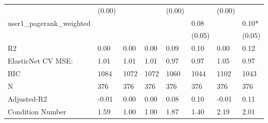 \begin{table}
\begin{center}
\begin{tabular}{llllllll}
                                               & (0.00)   &            &         & (0.00)  &          & (0.00)      &          \\
user1_pagerank_weighted                        &          &            &         &         & 0.08     &             & 0.10*    \\
                                               &          &            &         &         & (0.05)   &             & (0.05)   \\
R2                                             & 0.00     & 0.00       & 0.00    & 0.09    & 0.10     & 0.00        & 0.12     \\
ElasticNet CV MSE:                             & 1.01     & 1.01       & 1.01    & 0.97    & 0.97     & 1.05        & 0.97     \\
BIC                                            & 1084     & 1072       & 1072    & 1060    & 1044     & 1102        & 1043     \\
N                                              & 376      & 376        & 376     & 376     & 376      & 376         & 376      \\
Adjusted-R2                                    & -0.01    & 0.00       & 0.00    & 0.08    & 0.10     & -0.01       & 0.11     \\
Condition Number                               & 1.59     & 1.00       & 1.00    & 1.87    & 1.40     & 2.19        & 2.01     \\
\hline
\end{tabular}
\end{center}
\end{table}